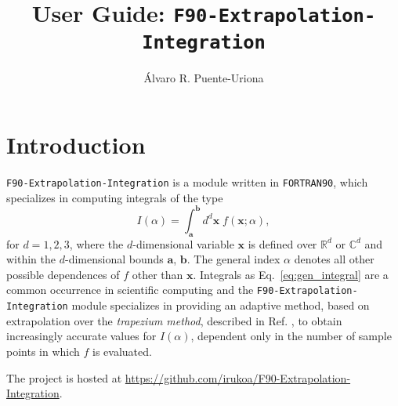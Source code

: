 \documentclass[12pt,a4paper]{article}
\title{User Guide: {\tt F90-Extrapolation-Integration}}
\author{{\'A}lvaro R. Puente-Uriona}
\begin{document}
\maketitle
\section{Introduction}
{\tt F90-Extrapolation-Integration} is a module written in {\tt FORTRAN90}, which specializes in computing integrals of the type
\begin{equation}\label{eq:gen_integral}
I(\alpha) = \int_{\bm{a}}^{\bm{b}}d^d \bm{x}\; f\left(\bm{x};\alpha \right),
\end{equation}
for $d = 1, 2, 3$, where the $d$-dimensional variable $\bm{x}$ is defined over $\mathbb{R}^d$ or $\mathbb{C}^d$ and within the $d$-dimensional bounds $\bm{a}$, $\bm{b}$. The general index $\alpha$ denotes all other possible dependences of $f$ other than $\bm{x}$. Integrals as Eq.~\eqref{eq:gen_integral} are a common occurrence in scientific computing and the {\tt F90-Extrapolation-Integration} module specializes in providing an adaptive method, based on extrapolation over the \textit{trapezium method}, described in Ref. \cite{puente-uriona2023}, to obtain increasingly accurate values for $I(\alpha)$, dependent only in the number of sample points in which $f$ is evaluated.

The project is hosted at \url{https://github.com/irukoa/F90-Extrapolation-Integration}.
\end{document}
